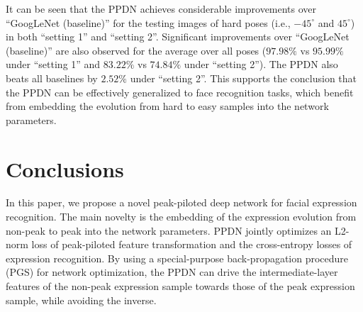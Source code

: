 \documentclass[runningheads]{llncs}
\begin{document}
It can be seen that the PPDN achieves considerable improvements over 
``GoogLeNet (baseline)'' for the testing images of hard poses 
(i.e., $-45^{\circ}$ and $45^{\circ}$) in both ``setting 1'' and ``setting 2''. 
Significant improvements over ``GoogLeNet (baseline)'' are also observed
for the average over all poses ($97.98\%$ vs $95.99\%$ under ``setting 1'' 
and $83.22\%$ vs $74.84\%$ under ``setting 2''). 
The PPDN also beats all baselines by $2.52\%$ under ``setting 2''. 
This supports the conclusion that the PPDN can be effectively generalized to 
face recognition tasks, which benefit from embedding the evolution from 
hard to easy samples into the network parameters. 





\section{Conclusions}

In this paper, we propose a novel peak-piloted deep network for facial 
expression recognition. The main novelty is the embedding of the
expression evolution from non-peak to peak into the network parameters.
PPDN jointly optimizes an L2-norm loss of peak-piloted feature 
transformation and the cross-entropy losses of expression recognition. 
By using a special-purpose back-propagation procedure (PGS) for network 
optimization, the PPDN can  drive the intermediate-layer features of the 
non-peak expression sample towards those of the peak expression sample, 
while avoiding the inverse.\\  %

\renewcommand{\theequation}{A-\arabic{equation}}
  \setcounter{equation}{0}  %
\end{document}
